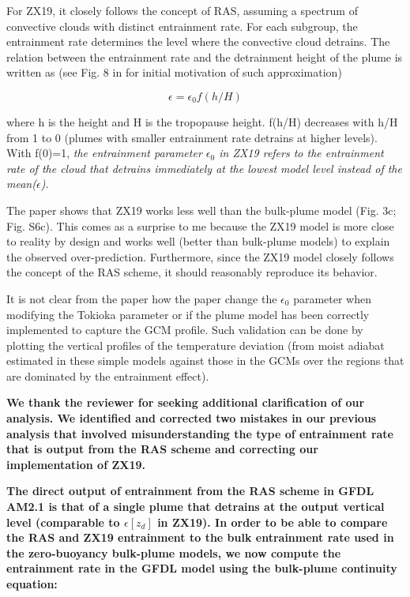 \documentclass[11pt]{article}
\begin{document}
For ZX19, it closely follows the concept of RAS, assuming a spectrum of convective clouds with distinct entrainment rate. For each subgroup, the entrainment rate determines the level where the convective cloud detrains. The relation between the entrainment rate and the detrainment height of the plume is written as (see Fig. 8 in \cite{arakawa1974} for initial motivation of such approximation)

\begin{equation}
\epsilon = \epsilon_0 f(h/H)
\end{equation}

where h is the height and H is the tropopause height. f(h/H) decreases with h/H from 1 to 0 (plumes with smaller entrainment rate detrains at higher levels). With f(0)=1, \emph{the entrainment parameter \(\epsilon_0\) in ZX19 refers to the entrainment rate of the cloud that detrains immediately at the lowest model level instead of the mean(\(\epsilon\)).}

The paper shows that ZX19 works less well than the bulk-plume model (Fig. 3c; Fig. S6c). This comes as a surprise to me because the ZX19 model is more close to reality by design and works well (better than bulk-plume models) to explain the observed over-prediction. Furthermore, since the ZX19 model closely follows the concept of the RAS scheme, it should reasonably reproduce its behavior.

It is not clear from the paper how the paper change the \(\epsilon_0\) parameter when modifying the Tokioka parameter or if the plume model has been correctly implemented to capture the GCM profile. Such validation can be done by plotting the vertical profiles of the temperature deviation (from moist adiabat estimated in these simple models against those in the GCMs over the regions that are dominated by the entrainment effect).

\textbf{We thank the reviewer for seeking additional clarification of our analysis. We identified and corrected two mistakes in our previous analysis that involved misunderstanding the type of entrainment rate that is output from the RAS scheme and correcting our implementation of ZX19.}

\textbf{The direct output of entrainment from the RAS scheme in GFDL AM2.1 is that of a single plume that detrains at the output vertical level (comparable to \(\epsilon[z_d]\) in ZX19). In order to be able to compare the RAS and ZX19 entrainment to the bulk entrainment rate used in the zero-buoyancy bulk-plume models, we now compute the entrainment rate in the GFDL model using the bulk-plume continuity equation:}
\end{document}

